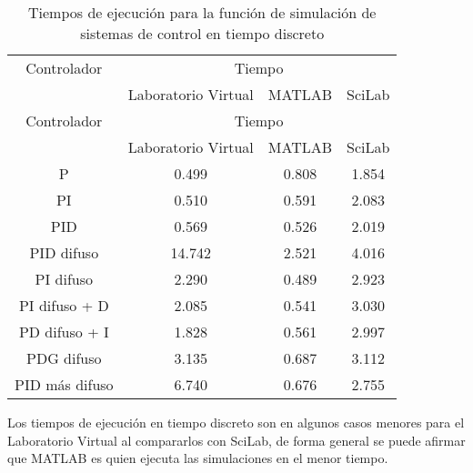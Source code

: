         {\setlength\LTleft{0pt}
        \setlength\LTright{0pt}
        \centering
        \renewcommand{\arraystretch}{0.80}
        \begin{longtable}{c @{\extracolsep{\fill}} ccc}
            \caption[Tiempos de ejecución para la función de simulación de sistemas de control en tiempo discreto]{Tiempos de ejecución para la función de simulación de sistemas de control en tiempo discreto}
            \label{tab:timeD} \\
            \toprule
            Controlador   &        \multicolumn{3}{c}{Tiempo}        \\ \cmidrule{1-1} \cmidrule{2-4}
                        &   Laboratorio Virtual  & MATLAB & SciLab  \\ \cmidrule{2-2} \cmidrule{3-3} \cmidrule{4-4}
            \endfirsthead
            \toprule
            Controlador   &        \multicolumn{3}{c}{Tiempo}        \\ \cmidrule{1-1} \cmidrule{2-4}
                        &   Laboratorio Virtual  & MATLAB & SciLab  \\ \cmidrule{2-2} \cmidrule{3-3} \cmidrule{4-4}
            \endhead
            \bottomrule
            \endfoot
            P              & 0.499  & 0.808 & 1.854 \\
            PI             & 0.510  & 0.591 & 2.083 \\
            PID            & 0.569  & 0.526 & 2.019 \\
            PID difuso     & 14.742 & 2.521 & 4.016 \\
            PI difuso      & 2.290  & 0.489 & 2.923 \\
            PI difuso + D  & 2.085  & 0.541 & 3.030 \\
            PD difuso + I  & 1.828  & 0.561 & 2.997 \\
            PDG difuso     & 3.135  & 0.687 & 3.112 \\
            PID más difuso & 6.740  & 0.676 & 2.755 \\
        \end{longtable}}

        Los tiempos de ejecución en tiempo discreto son en algunos casos menores para el Laboratorio Virtual al compararlos con SciLab, de forma general se puede afirmar que MATLAB es quien ejecuta las simulaciones en el menor tiempo.
